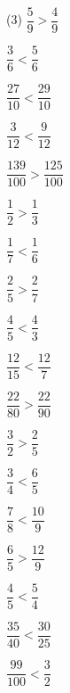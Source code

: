 \begin{atividade}
\begin{itemize}
\begin{enumerate}[label=\roman*)]
\begin{center}
\begin{tikzpicture}[x=5cm]
        \end{tikzpicture}
      \end{center}
    \end{enumerate}
\end{itemize}

\solucao
\begin{tasks}(3)
\task $\dfrac{5}{9} > \dfrac{4}{9}$

\task $\dfrac{3}{6} < \dfrac{5}{6}$

\task $\dfrac{27}{10} < \dfrac{29}{10}$

\task $\dfrac{3}{12} < \dfrac{9}{12}$

\task $\dfrac{139}{100} >\dfrac{125}{100}$

\task $\dfrac{1}{2} > \dfrac{1}{3}$

\task $\dfrac{1}{7} < \dfrac{1}{6}$

\task $\dfrac{2}{5} > \dfrac{2}{7}$

\task $\dfrac{4}{5} < \dfrac{4}{3}$

\task $\dfrac{12}{15} < \dfrac{12}{7}$

\task $\dfrac{22}{80} > \dfrac{22}{90}$

\task $\dfrac{3}{2} > \dfrac{2}{5}$

\task $\dfrac{3}{4} < \dfrac{6}{5}$

\task $\dfrac{7}{8} < \dfrac{10}{9}$

\task $\dfrac{6}{5} > \dfrac{12}{9}$

\task $\dfrac{4}{5}< \dfrac{5}{4}$

\task $\dfrac{35}{40}< \dfrac{30}{25}$

\task $\dfrac{99}{100}<\dfrac{3}{2}$
\end{tasks}

\end{atividade}

